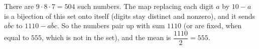 There are $9\cdot8\cdot7=504$ such numbers. The map replacing each digit $a$ by $10-a$ is a bijection of this set onto itself (digits stay distinct and nonzero), and it sends $\overline{abc}$ to $1110-\overline{abc}$. So the numbers pair up with sum $1110$ (or are fixed, when equal to $555$, which is not in the set), and the mean is $\dfrac{1110}{2}=\boxed{555}$.
